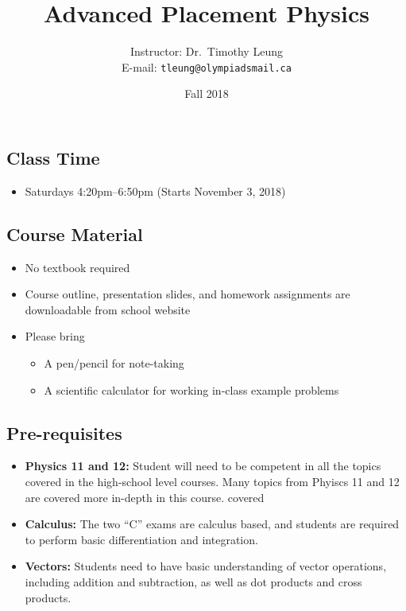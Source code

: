 \documentclass[11pt]{article}
\title{\vspace{-0.2in}\textbf{Advanced Placement Physics}}
\author{Instructor: Dr.\ Timothy Leung\\
  E-mail: \texttt{tleung@olympiadsmail.ca}}
\date{Fall 2018}
\begin{document}
\maketitle

\subsection*{Class Time}
\begin{itemize}[itemsep=.1em,leftmargin=12pt] %
\item Saturdays 4:20pm--6:50pm (Starts November 3, 2018)
\end{itemize}

\subsection*{Course Material}
\begin{itemize}[itemsep=.1em,leftmargin=12pt] %
\item No textbook required
\item Course outline, presentation slides, and homework assignments are
  downloadable from school website
\item Please bring
  \begin{itemize}[noitemsep,topsep=0pt]
  \item A pen/pencil for note-taking
  \item A scientific calculator for working in-class example problems
  \end{itemize}
\end{itemize}

\subsection*{Pre-requisites}
  \begin{itemize}[itemsep=.1em,leftmargin=12pt]
  \item\textbf{Physics 11 and 12:} Student will need to be competent in all the
    topics covered in the high-school level courses. Many topics from Phyiscs
    11 and 12 are covered more in-depth in this course.
    covered
  \item\textbf{Calculus:} The two ``C'' exams are calculus based, and students
    are required to perform basic differentiation and integration.
  \item\textbf{Vectors:} Students need to have basic understanding of vector
    operations, including addition and subtraction, as well as dot products and
    cross products.
  \end{itemize}
\end{document}
